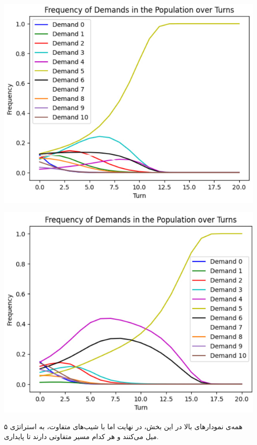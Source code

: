 \begin{center}
	\includegraphics{6}
\end{center}

\begin{center}
	\includegraphics{7}
\end{center}

همه‌ی نمودارهای بالا در این بخش، در نهایت اما با شیب‌های متفاوت، به استراتژی ۵ میل می‌کنند و هر کدام مسیر متفاوتی دارند تا پایداری.

